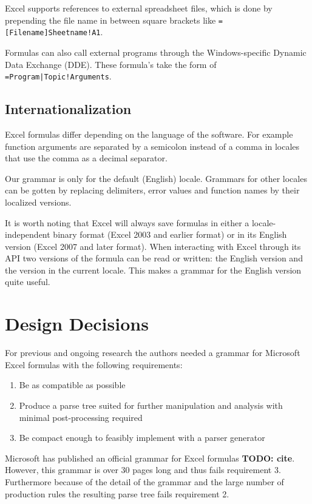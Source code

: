 \documentclass[conference]{IEEEtran}
\newcommand{\todo}[1]{\textbf{TODO: #1}}
\begin{document}
Excel supports references to external spreadsheet files, which is done by prepending the file name in between square brackets like \texttt{=[Filename]Sheetname!A1}.

Formulas can also call external programs through the Windows-specific Dynamic Data Exchange (DDE).
These formula's take the form of \texttt{=Program|Topic!Arguments}.

\subsection{Internationalization}

Excel formulas differ depending on the language of the software. For example function arguments are separated by a semicolon instead of a comma in locales that use the comma as a decimal separator.

Our grammar is only for the default (English) locale. Grammars for other locales can be gotten by replacing delimiters, error values and function names by their localized versions.

It is worth noting that Excel will always save formulas in either a locale-independent binary format (Excel 2003 and earlier format) or in its English version (Excel 2007 and later format). When interacting with Excel through its API two versions of the formula can be read or written: the English version and the version in the current locale.
This makes a grammar for the English version quite useful.

\section{Design Decisions}
For previous and ongoing research the authors needed a grammar for Microsoft Excel formulas with the following requirements:

\begin{enumerate}
\item Be as compatible as possible
\item Produce a parse tree suited for further manipulation and analysis with minimal post-processing required
\item Be compact enough to feasibly implement with a parser generator
\end{enumerate}

Microsoft has published an official grammar for Excel formulas \todo{cite}.
However, this grammar is over 30 pages long and thus fails requirement 3.
Furthermore because of the detail of the grammar and the large number of production rules the resulting parse tree fails requirement 2.
\end{document}
